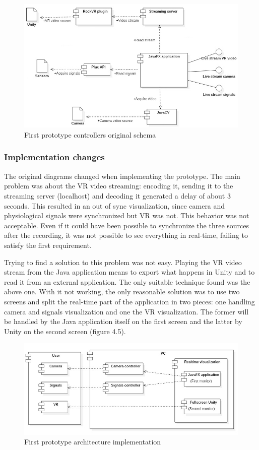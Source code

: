 \documentclass[binding=0.6cm,LaM]{sapthesis}
\begin{document}
\begin{figure}
\centering
\includegraphics[scale=.5]{images/prot1_controllers_original2}
\caption{First prototype controllers original schema}
\end{figure}

\subsubsection{Implementation changes}
The original diagrams changed when implementing the prototype. The main problem was about the VR video streaming: encoding it, sending it to the streaming server (localhost) and decoding it generated a delay of about 3 seconds. This resulted in an out of sync visualization, since camera and physiological signals were synchronized but VR was not. This behavior was not acceptable. Even if it could have been possible to synchronize the three sources after the recording, it was not possible to see everything in real-time, failing to satisfy the first requirement.

Trying to find a solution to this problem was not easy. Playing the VR video stream from the Java application means to export what happens in Unity and to read it from an external application. The only suitable technique found was the above one. With it not working, the only reasonable solution was to use two screens and split the real-time part of the application in two pieces: one handling camera and signals visualization and one the VR visualization. The former will be handled by the Java application itself on the first screen and the latter by Unity on the second screen (figure 4.5).

\begin{figure}[h]
\centering
\includegraphics[scale=.5]{images/prot1_implementation}
\caption{First prototype architecture implementation}
\end{figure}
\end{document}
